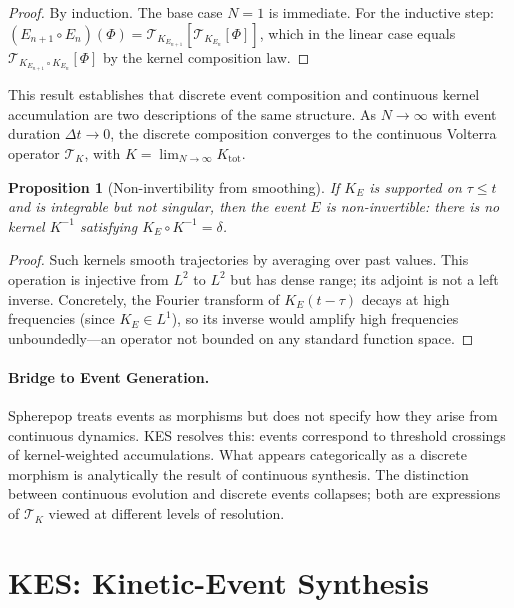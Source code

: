 \documentclass[12pt]{article}
\newtheorem{proposition}[theorem]{Proposition}
\newcommand{\TK}{\mathcal{T}_K}
\begin{document}
\begin{proof}
By induction. The base case $N=1$ is immediate. For the inductive step:
$(E_{n+1}\circ E_n)(\Phi) = \mathcal{T}_{K_{E_{n+1}}}[\mathcal{T}_{K_{E_n}}[\Phi]]$,
which in the linear case equals $\mathcal{T}_{K_{E_{n+1}}\circ K_{E_n}}[\Phi]$
by the kernel composition law.
\end{proof}

This result establishes that discrete event composition and continuous kernel
accumulation are two descriptions of the same structure. As $N \to \infty$
with event duration $\Delta t \to 0$, the discrete composition converges to
the continuous Volterra operator $\TK$, with $K = \lim_{N\to\infty} K_{\mathrm{tot}}$.

\begin{proposition}[Non-invertibility from smoothing]
\label{prop:noninvert}
If $K_E$ is supported on $\tau \leq t$ and is integrable but not singular,
then the event $E$ is non-invertible: there is no kernel $K^{-1}$ satisfying
$K_E \circ K^{-1} = \delta$.
\end{proposition}

\begin{proof}
Such kernels smooth trajectories by averaging over past values. This operation
is injective from $L^2$ to $L^2$ but has dense range; its adjoint is not a
left inverse. Concretely, the Fourier transform of $K_E(t-\tau)$ decays at
high frequencies (since $K_E \in L^1$), so its inverse would amplify high
frequencies unboundedly---an operator not bounded on any standard function space.
\end{proof}

\paragraph{Bridge to Event Generation.}
Spherepop treats events as morphisms but does not specify how they arise
from continuous dynamics. KES resolves this: events correspond to threshold
crossings of kernel-weighted accumulations. What appears categorically as a
discrete morphism is analytically the result of continuous synthesis. The
distinction between continuous evolution and discrete events collapses;
both are expressions of $\TK$ viewed at different levels of resolution.

\section{KES: Kinetic-Event Synthesis}
\label{sec:kes}
\end{document}
